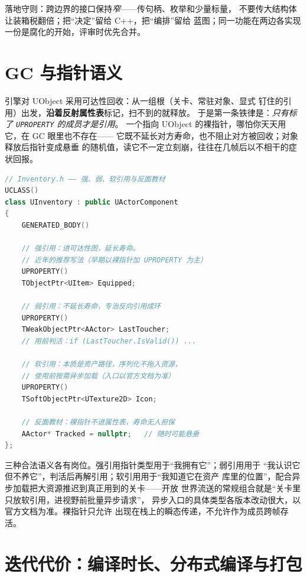 \documentclass[12pt,a4paper,fontset=fandol]{ctexbook}
\newcommand{\Tp}[1]{\texttt{#1}}
\newcommand{\Lang}[1]{\textsf{#1}}
\newcommand{\CPP}{\Lang{C++}}
\begin{document}
落地守则：跨边界的接口保持\emph{窄}——传句柄、枚举和少量标量，
不要传大结构体让装箱税翻倍；把``决定''留给 \CPP{}，把``编排''留给
蓝图；同一功能在两边各实现一份是腐化的开始，评审时优先合并。

\section{GC 与指针语义}
\label{sec:ch10-gc-pointers}

引擎对 UObject 采用可达性回收：从一组根（关卡、常驻对象、显式
钉住的引用）出发，\textbf{沿着反射属性表}标记，扫不到的就释放。
于是第一条铁律是：\emph{只有标了 \Tp{UPROPERTY} 的成员才是引用}。
一个指向 UObject 的裸指针，哪怕你天天用它，在 GC 眼里也不存在——
它既不延长对方寿命，也不阻止对方被回收；对象释放后指针变成悬垂
的随机值，读它不一定立刻崩，往往在几帧后以不相干的症状回报。

\begin{lstlisting}[language=C++, style=cppstyle,
  caption={成员声明片段：三种指针语义，三种 GC 命运},
  label={lst:ch10-gc-members}]
// Inventory.h —— 强、弱、软引用与反面教材
UCLASS()
class UInventory : public UActorComponent
{
    GENERATED_BODY()

    // 强引用：进可达性图，延长寿命。
    // 近年的推荐写法（早期以裸指针加 UPROPERTY 为主）
    UPROPERTY()
    TObjectPtr<UItem> Equipped;

    // 弱引用：不延长寿命，专治反向引用成环
    UPROPERTY()
    TWeakObjectPtr<AActor> LastToucher;
    // 用前判活：if (LastToucher.IsValid()) ...

    // 软引用：本质是资产路径，序列化不拖入资源，
    // 使用前按需异步加载（入口以官方文档为准）
    UPROPERTY()
    TSoftObjectPtr<UTexture2D> Icon;

    // 反面教材：裸指针不进属性表，寿命无人担保
    AActor* Tracked = nullptr;   // 随时可能悬垂
};
\end{lstlisting}

三种合法语义各有岗位。强引用指针类型用于``我拥有它''；弱引用用于
``我认识它但不养它''，判活后再解引用；软引用用于``我知道它在资产
库里的位置''，配合异步加载把大资源推迟到真正用到的关卡——开放
世界流送的常规组合就是``关卡里只放软引用，进视野前批量异步请求''，
异步入口的具体类型各版本改动很大，以官方文档为准。裸指针只允许
出现在栈上的瞬态传递，不允许作为成员跨帧存活。

\section{迭代代价：编译时长、分布式编译与打包}
\label{sec:ch10-build-cost}
\end{document}
